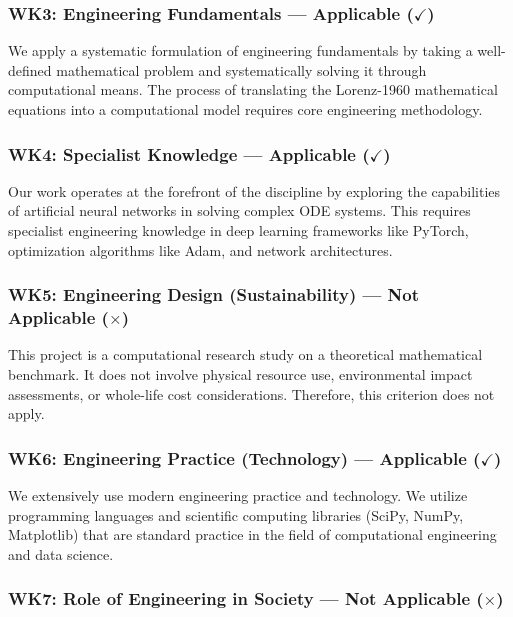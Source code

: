 \subsubsection{WK3: Engineering Fundamentals --- Applicable ($\checkmark$)}

We apply a systematic formulation of engineering fundamentals by taking a well-defined mathematical problem and systematically solving it through computational means. The process of translating the Lorenz-1960 mathematical equations into a computational model requires core engineering methodology.

\subsubsection{WK4: Specialist Knowledge --- Applicable ($\checkmark$)}

Our work operates at the forefront of the discipline by exploring the capabilities of artificial neural networks in solving complex ODE systems. This requires specialist engineering knowledge in deep learning frameworks like PyTorch, optimization algorithms like Adam, and network architectures.

\subsubsection{WK5: Engineering Design (Sustainability) --- Not Applicable ($\times$)}

This project is a computational research study on a theoretical mathematical benchmark. It does not involve physical resource use, environmental impact assessments, or whole-life cost considerations. Therefore, this criterion does not apply.

\subsubsection{WK6: Engineering Practice (Technology) --- Applicable ($\checkmark$)}

We extensively use modern engineering practice and technology. We utilize programming languages and scientific computing libraries (SciPy, NumPy, Matplotlib) that are standard practice in the field of computational engineering and data science.

\subsubsection{WK7: Role of Engineering in Society --- Not Applicable ($\times$)}

